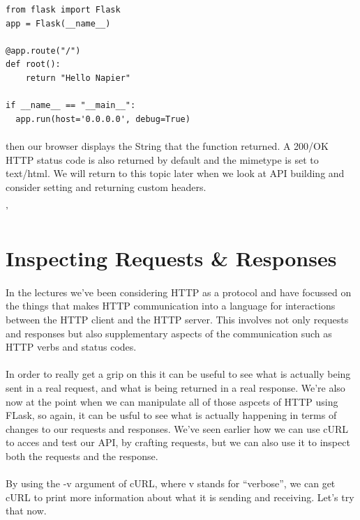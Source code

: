 \documentclass[12pt, a4paper, oneside]{book}
\begin{document}
{\begin{lstlisting}
from flask import Flask
app = Flask(__name__)

@app.route("/")
def root():
    return "Hello Napier"

if __name__ == "__main__":
  app.run(host='0.0.0.0', debug=True)
\end{lstlisting}

\paragraph{} then our browser displays the String that the function returned. A 200/OK HTTP status code is also returned by default and the mimetype is set to text/html. We will return to this topic later when we look at API building and consider setting and returning custom headers.


'\section{Inspecting Requests \& Responses}
\label{inspecting-requests-and-responses}
\paragraph{} In the lectures we've been considering HTTP as a protocol and have focussed on the things that makes HTTP communication into a language for interactions between the HTTP client and the HTTP server. This involves not only requests and responses but also supplementary aspects of the communication such as HTTP verbs and status codes. 

\paragraph{} In order to really get a grip on this it can be useful to see what is actually being sent in a real request, and what is being returned in a real response. We're also now at the point when we can manipulate all of those aspcets of HTTP using FLask, so again, it can be usful to see what is actually happening in terms of changes to our requests and responses. We've seen earlier how we can use cURL to acces and test our API, by crafting requests, but we can also use it to inspect both the requests and the response.

\paragraph{} By using the -v argument of cURL, where v stands for ``verbose'', we can get cURL to print more information about what it is sending and receiving. Let's try that now.

}
\end{document}

